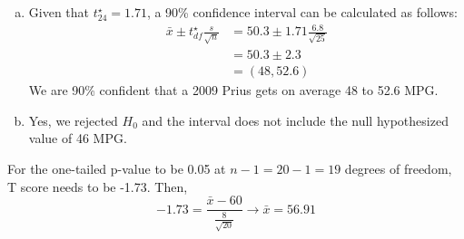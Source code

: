 {{\begin{enumerate}[(a)]
\begin{enumerate}[1.]
\begin{itemize}
\item Randomization condition: We will assume that the sample is random though this assumption might not be plausible since drivers who volunteer to submit their gas mileage might be those that are getting much lower or much higher than the gas mileage claimed by the EPA.
\item 10\% Condition: 25 $<$ 10\% of all 2009 Prii.
\end{itemize}
Since we have a random sample and 10\% condition is met, we can assume that the gas mileage of one car in the sample is independent of another.
\item Nearly normal condition: The sample distribution looks somewhat right skewed but the skew is not very strong.
\end{enumerate}
The test statistic and the p-value can be calculated as follows:
\begin{align*}
T_{df} &= \frac{\bar{x} - \mu}{\frac{s}{\sqrt{n}}} = \frac{50.3 - 46}{\frac{6.8}{\sqrt{25}}} = 3.16 \\
df &= n - 1 = 25 - 1 = 24 \\
p-value < 0.01
\end{align*}
Since p-value $<$ 0.01 we reject $H_0$. The data provide strong evidence against the EPA claim of 46 MPG.
\item Given that $t_{24}^\star = 1.71$, a 90\% confidence interval can be calculated as follows:
\begin{align*}
\bar{x} \pm t_{df}^\star \frac{s}{\sqrt{n}} &= 50.3 \pm 1.71 \frac{6.8}{\sqrt{25}} \\
&= 50.3 \pm 2.3 \\
&= (48, 52.6)
\end{align*}
We are 90\% confident that a 2009 Prius gets on average 48 to 52.6 MPG.
\item Yes, we rejected $H_0$ and the interval does not include the null hypothesized value of 46 MPG.
\end{enumerate}
}
}


{
{
For the one-tailed p-value to be 0.05 at $n - 1 = 20 - 1 = 19$ degrees of freedom, T score needs to be -1.73. Then,
\[ -1.73 = \frac{\bar{x} - 60}{\frac{8}{\sqrt{20}}} \rightarrow \bar{x} = 56.91 \]
}
}

